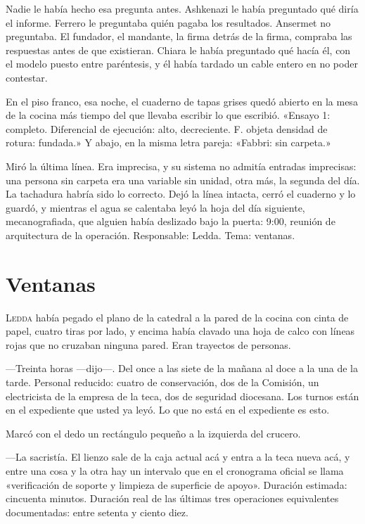 Nadie le había hecho esa pregunta antes. Ashkenazi le había preguntado qué diría el informe. Ferrero le preguntaba quién pagaba los resultados. Ansermet no preguntaba. El fundador, el mandante, la firma detrás de la firma, compraba las respuestas antes de que existieran. Chiara le había preguntado qué hacía él, con el modelo puesto entre paréntesis, y él había tardado un cable entero en no poder contestar.

En el piso franco, esa noche, el cuaderno de tapas grises quedó abierto en la mesa de la cocina más tiempo del que llevaba escribir lo que escribió. «Ensayo 1: completo. Diferencial de ejecución: alto, decreciente. F. objeta densidad de rotura: fundada.» Y abajo, en la misma letra pareja: «Fabbri: sin carpeta.»

Miró la última línea. Era imprecisa, y su sistema no admitía entradas imprecisas: una persona sin carpeta era una variable sin unidad, otra más, la segunda del día. La tachadura habría sido lo correcto. Dejó la línea intacta, cerró el cuaderno y lo guardó, y mientras el agua se calentaba leyó la hoja del día siguiente, mecanografiada, que alguien había deslizado bajo la puerta: 9:00, reunión de arquitectura de la operación. Responsable: Ledda. Tema: ventanas.

\clearpage

\chapter{Ventanas}

\lettrine[lines=2, lhang=0.1, nindent=0.2em]{L}{edda} había pegado el plano de la catedral a la pared de la cocina con cinta de papel, cuatro tiras por lado, y encima había clavado una hoja de calco con líneas rojas que no cruzaban ninguna pared. Eran trayectos de personas.


---Treinta horas ---dijo---. Del once a las siete de la mañana al doce a la una de la tarde. Personal reducido: cuatro de conservación, dos de la Comisión, un electricista de la empresa de la teca, dos de seguridad diocesana. Los turnos están en el expediente que usted ya leyó. Lo que no está en el expediente es esto.

Marcó con el dedo un rectángulo pequeño a la izquierda del crucero.

---La sacristía. El lienzo sale de la caja actual acá y entra a la teca nueva acá, y entre una cosa y la otra hay un intervalo que en el cronograma oficial se llama «verificación de soporte y limpieza de superficie de apoyo». Duración estimada: cincuenta minutos. Duración real de las últimas tres operaciones equivalentes documentadas: entre setenta y ciento diez.

